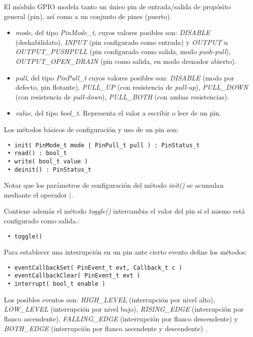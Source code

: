 El módulo GPIO modela tanto un único pin de entrada/salida de propósito general (pin), así como a un conjunto de pines (puerto). 


\begin{itemize}
\item
\emph{mode}, del tipo \emph{PinMode\_t}, cuyos valores posibles son: \emph{DISABLE} (deshabilidato), \emph{INPUT} (pin configurado como entrada) y \emph{OUTPUT} u \emph{OUTPUT\_PUSHPULL} (pin configurado como salida, modo \emph{push-pull}), \emph{OUTPUT\_OPEN\_DRAIN} (pin como salida, en modo drenador abierto).
\item
\emph{pull}, del tipo \emph{PinPull\_t} cuyos valores posibles son: \emph{DISABLE} (modo por defecto, pin flotante), \emph{PULL\_UP} (con resistencia de \emph{pull-up}), \emph{PULL\_DOWN} (con resistencia de \emph{pull-down}), \emph{PULL\_BOTH} (con ambas resistencias).
\item
\emph{value}, del tipo \emph{bool\_t}. Representa el valor a escribir o leer de un pin.
\end{itemize}


Los métodos básicos de configuración y uso de un pin son:

\begin{verbatim}
 • init( PinMode_t mode | PinPull_t pull ) : PinStatus_t
 • read() : bool_t
 • write( bool_t value )
 • deinit() : PinStatus_t
\end{verbatim}

Notar que los parámetros de configuración del método \emph{init()} se acumulan mediante el operador $|$. 

Contiene además el método \emph{toggle()} intercambia el valor del pin si el mismo está configurado como salida.:

\begin{verbatim}
 • toggle()
\end{verbatim}

Para establecer una interrupción en un pin ante cierto evento define los métodos: 

\begin{verbatim}
 • eventCallbackSet( PinEvent_t evt, Callback_t c )
 • eventCallbackClear( PinEvent_t evt )
 • interrupt( bool_t enable )
\end{verbatim}

Los posibles eventos son: \emph{HIGH\_LEVEL} (interrupción por nivel alto), \emph{LOW\_LEVEL} (interrupción por nivel bajo), \emph{RISING\_EDGE} (interrupción por flanco ascendente), \emph{FALLING\_EDGE} (interrupción por flanco descendente) y \emph{BOTH\_EDGE} (interrupción por flanco ascendente y descendente) .


